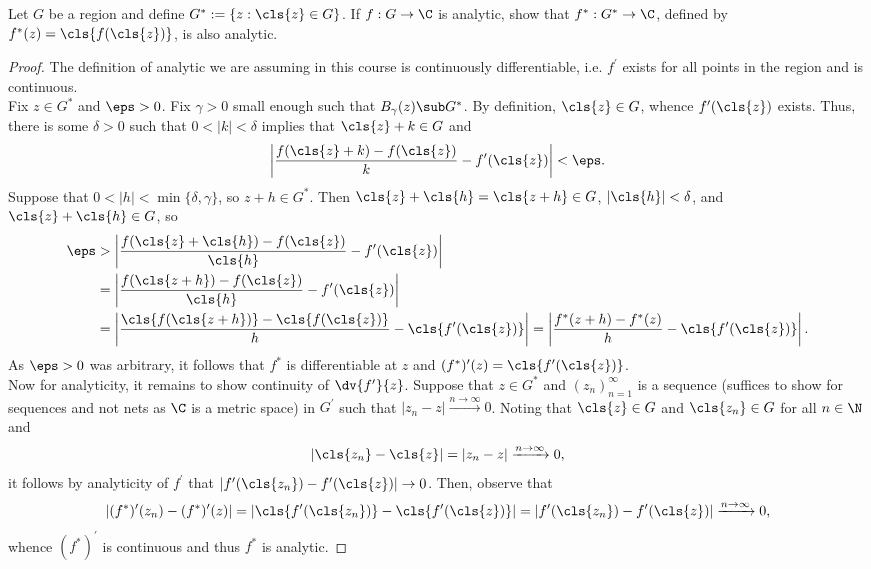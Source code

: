 \documentclass[12pt]{article}
\begin{document}
\begin{homeworkProblem}
  Let $ G $ be a region and define $ G^{*} := \{z: \cls{z}\in G\} $. If $ f:G\to \C $ is analytic, show that $ f^{*}:G^{*}\to \C $, defined by $ f^{*}(z) = \cls{f(\cls{z})} $, is also analytic.

\begin{proof}
  The definition of analytic we are assuming in this course is continuously differentiable, i.e. $ f^{\prime} $ exists for all points in the region and is continuous.\\

  Fix $ z\in G^{*} $ and $ \eps>0 $. Fix $ \gamma>0 $ small enough such that $ B_{\gamma}(z) \sub G^{*} $. By definition, $ \cls{z}\in G $, whence $ f^{\prime}(\cls{z}) $ exists. Thus, there is some $ \delta >0 $ such that $ 0< |k| < \delta $ implies that $ \cls{z}+ k \in G $ and 
  \[
    \left|\frac{f(\cls{z} + k) - f(\cls{z})}{k} - f^{\prime}(\cls{z})\right | < \eps.
  \]
  Suppose that $ 0< |h| < \min\{\delta, \gamma\} $, so $ z + h\in G^{*} $. Then $ \cls{z}+ \cls{h} = \cls{z+h} \in G $, $ |\cls{h}| < \delta $, and $ \cls{z}+ \cls{h}\in G $, so 
  \begin{align*}
    \eps &> \left|\frac{f(\cls{z} + \cls{h}) - f(\cls{z})}{\cls{h}} - f^{\prime}(\cls{z})\right |  \\
    &=\left|\frac{f(\cls{z+h}) - f(\cls{z})}{\cls{h}} - f^{\prime}(\cls{z})\right |  \\ 
    &=\left|\frac{\cls{f(\cls{z+h})} - \cls{f(\cls{z})}}{h} - \cls{f^{\prime}(\cls{z})}\right |=\left|\frac{f^{*}(z+h) - f^{*}(z)}{h} - \cls{f^{\prime}(\cls{z})}\right |.  \\ 
  \end{align*}
  As $ \eps>0 $ was arbitrary, it follows that $ f^{*} $ is differentiable at $ z $ and $(f^{*})^{\prime}(z) = \cls{f^{\prime}(\cls{z})} $.\\

  Now for analyticity, it remains to show continuity of $ \dv{f^{\prime}}{z} $. Suppose that $ z\in G^{*} $ and $ (z_{n})_{n=1}^{\infty}$ is a sequence (suffices to show for sequences and not nets as $ \C $ is a metric space) in $ G^{\prime} $ such that $ |z_{n}- z| \xrightarrow{n\to \infty}0 $. Noting that $ \cls{z}\in G $ and $ \cls{z_{n}}\in G $ for all $ n\in \N $ and 
  \[
    |\cls{z_{n}} - \cls{z} | = |z_{n}- z| \xrightarrow{n\to\infty}0,
  \]
  it follows by analyticity of $ f^{\prime} $ that $ |f^{\prime}(\cls{z_{n}}) - f^{\prime}(\cls{z})|\to 0 $. Then, observe that
  \[
    |(f^{*})^{\prime}(z_{n}) - (f^{*})^{\prime}(z)| = |\cls{f^{\prime}(\cls{z_{n}})} - \cls{f^{\prime}(\cls{z})}| = |f^{\prime}(\cls{z_{n}}) - f^{\prime}(\cls{z})|\xrightarrow{n\to \infty} 0,
  \]
  whence $ (f^{*})^{\prime} $ is continuous and thus $ f^{*} $ is analytic. 
\end{proof}
\end{homeworkProblem}
\end{document}
